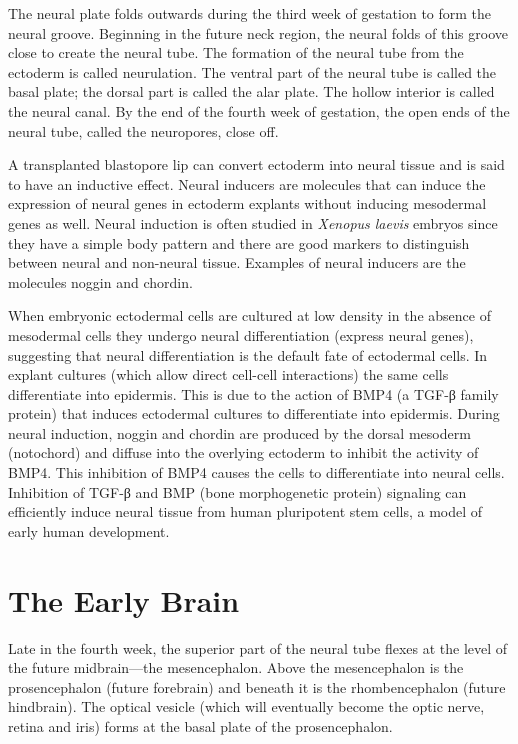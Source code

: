 The neural plate folds outwards during the third week of gestation to form the neural groove. Beginning in the future neck region, the neural folds of this groove close to create the neural tube. The formation of the neural tube from the ectoderm is called neurulation. The ventral part of the neural tube is called the basal plate; the dorsal part is called the alar plate. The hollow interior is called the neural canal. By the end of the fourth week of gestation, the open ends of the neural tube, called the neuropores, close off.

A transplanted blastopore lip can convert ectoderm into neural tissue and is said to have an inductive effect. Neural inducers are molecules that can induce the expression of neural genes in ectoderm explants without inducing mesodermal genes as well. Neural induction is often studied in \emph{Xenopus laevis} embryos since they have a simple body pattern and there are good markers to distinguish between neural and non-neural tissue. Examples of neural inducers are the molecules noggin and chordin.

When embryonic ectodermal cells are cultured at low density in the absence of mesodermal cells they undergo neural differentiation (express neural genes), suggesting that neural differentiation is the default fate of ectodermal cells. In explant cultures (which allow direct cell-cell interactions) the same cells differentiate into epidermis. This is due to the action of BMP4 (a TGF-β family protein) that induces ectodermal cultures to differentiate into epidermis. During neural induction, noggin and chordin are produced by the dorsal mesoderm (notochord) and diffuse into the overlying ectoderm to inhibit the activity of BMP4. This inhibition of BMP4 causes the cells to differentiate into neural cells. Inhibition of TGF-β and BMP (bone morphogenetic protein) signaling can efficiently induce neural tissue from human pluripotent stem cells, a model of early human development.

\hypertarget{the-early-brain}{%
\section{The Early Brain}\label{the-early-brain}}

Late in the fourth week, the superior part of the neural tube flexes at the level of the future midbrain---the mesencephalon. Above the mesencephalon is the prosencephalon (future forebrain) and beneath it is the rhombencephalon (future hindbrain). The optical vesicle (which will eventually become the optic nerve, retina and iris) forms at the basal plate of the prosencephalon.

